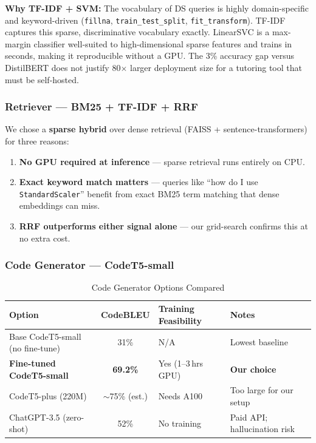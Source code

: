 \documentclass[12pt,a4paper]{article}
\begin{document}
\textbf{Why TF-IDF + SVM:} The vocabulary of DS queries is highly domain-specific and keyword-driven (\texttt{fillna}, \texttt{train\_test\_split}, \texttt{fit\_transform}). TF-IDF captures this sparse, discriminative vocabulary exactly. LinearSVC is a max-margin classifier well-suited to high-dimensional sparse features and trains in seconds, making it reproducible without a GPU. The 3\% accuracy gap versus DistilBERT does not justify 80$\times$ larger deployment size for a tutoring tool that must be self-hosted.

\subsubsection{Retriever --- BM25 + TF-IDF + RRF}

We chose a \textbf{sparse hybrid} over dense retrieval (FAISS + sentence-transformers) for three reasons:
\begin{enumerate}[leftmargin=*]
  \item \textbf{No GPU required at inference} --- sparse retrieval runs entirely on CPU.
  \item \textbf{Exact keyword match matters} --- queries like ``how do I use \texttt{StandardScaler}'' benefit from exact BM25 term matching that dense embeddings can miss.
  \item \textbf{RRF outperforms either signal alone} --- our grid-search confirms this at no extra cost.
\end{enumerate}

\subsubsection{Code Generator --- CodeT5-small}

\begin{table}[h!]
\centering
\caption{Code Generator Options Compared}
\begin{tabular}{lcll}
\toprule
Option & CodeBLEU & Training Feasibility & Notes \\
\midrule
Base CodeT5-small (no fine-tune) & 31\% & N/A & Lowest baseline \\
\textbf{Fine-tuned CodeT5-small} & \textbf{69.2\%} & Yes (1--3\,hrs GPU) & \textbf{Our choice} \\
CodeT5-plus (220M) & $\sim$75\% (est.) & Needs A100 & Too large for our setup \\
ChatGPT-3.5 (zero-shot) & 52\% & No training & Paid API; hallucination risk \\
\bottomrule
\end{tabular}
\end{table}
\end{document}

